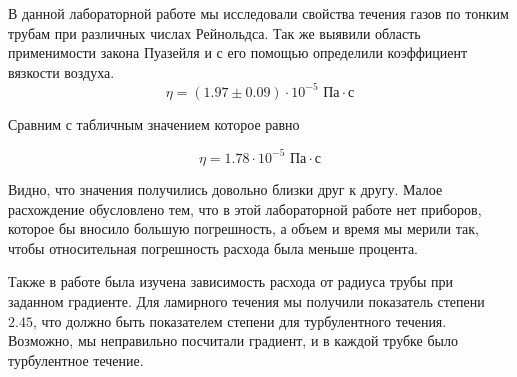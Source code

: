 \documentclass[a4paper, 12pt]{article}
\begin{document}
В данной лабораторной работе мы исследовали свойства течения газов по тонким трубам при различных числах Рейнольдса. Так же выявили область применимости закона Пуазейля и с его помощью определили коэффициент вязкости воздуха. 
\[ \eta = (1.97\pm 0.09) \cdot 10^{-5} \text{ Па}\cdot \text{с} \] 

Сравним с табличным значением которое равно

\[ \eta = 1.78 \cdot 10^{-5} \text{ Па}\cdot \text{с} \] 

Видно, что значения получились довольно близки друг к другу. Малое расхождение обусловлено тем, что в этой лабораторной работе нет приборов, которое бы вносило большую погрешность, а объем и время мы мерили так, чтобы относительная погрешность расхода была меньше процента. 

Также в работе была изучена зависимость расхода от радиуса трубы при заданном градиенте. Для ламирного течения мы получили показатель степени $2.45$, что должно быть показателем степени для турбулентного течения. Возможно, мы неправильно посчитали градиент, и в каждой трубке было турбулентное течение.
\end{document}
